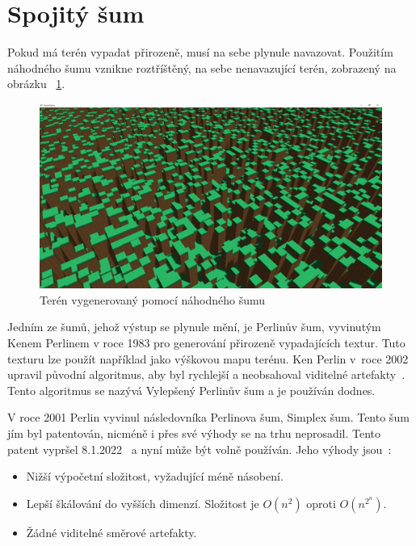 \documentclass[thesis=M,czech]{FITthesis}[2019/12/23]
\begin{document}
\section{Spojitý šum}

Pokud má terén vypadat přirozeně, musí na sebe plynule navazovat. Použitím náhodného šumu vznikne roztříštěný, na sebe nenavazující terén, zobrazený na obrázku ~\ref{fig:random_terrain}.

\begin{figure}\centering
	\includegraphics[width=\textwidth]{images/world_gen/random_terrain}
	\caption[Terén vygenerovaný pomocí náhodného šumu]{Terén vygenerovaný pomocí náhodného šumu}\label{fig:random_terrain}
\end{figure}

Jedním ze šumů, jehož výstup se plynule mění, je Perlinův šum, vyvinutým Kenem Perlinem v roce 1983 pro generování přirozeně vypadajících textur. Tuto texturu lze použít například jako výškovou mapu terénu. Ken Perlin v~roce 2002 upravil původní algoritmus, aby byl rychlejší a neobsahoval viditelné artefakty~\cite{perlin_noise}. Tento algoritmus se nazývá Vylepšený Perlinův šum a je používán dodnes.

V roce 2001 Perlin vyvinul následovníka Perlinova šum, Simplex šum. Tento šum jím byl patentován, nicméně i přes své výhody se na trhu neprosadil. Tento patent vypršel 8.1.2022~\cite{patent} a nyní může být volně používán. Jeho výhody jsou~\cite{simplex_perlin}:

\begin{itemize}
\item Nižší výpočetní složitost, vyžadující méně násobení.
\item Lepší škálování do vyšších dimenzí. Složitost je $O(n^2)$ oproti $O(n^{2^n})$.
\item Žádné viditelné směrové artefakty.
\end{itemize}
\end{document}
